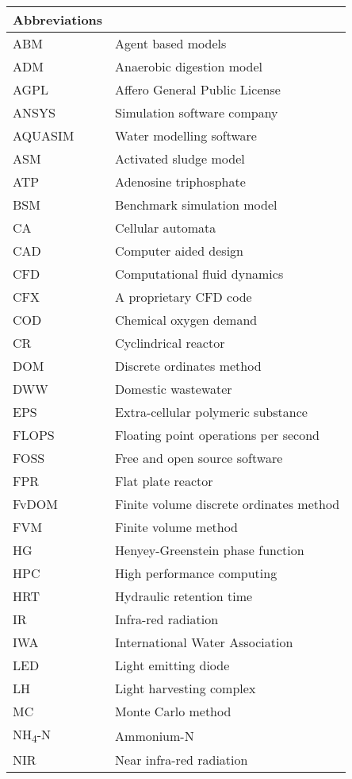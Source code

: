 \begin{center}
	\small
	\begin{longtable}{ll}
	\toprule
	Abbreviations & {} \\
	\bottomrule
ABM	&	Agent based models	\\
ADM	&	Anaerobic digestion model	\\
AGPL	&	Affero General Public License	\\
ANSYS	&	Simulation software company	\\
AQUASIM	&	Water modelling software	\\
ASM	&	Activated sludge model	\\
ATP	&	Adenosine triphosphate	\\
BSM	&	Benchmark simulation model	\\
CA	&	Cellular automata	\\
CAD	&	Computer aided design	\\
CFD	&	Computational fluid dynamics	\\
CFX	 &	A proprietary CFD code	\\
COD	&	Chemical oxygen demand	\\
CR	&	Cyclindrical reactor	\\
DOM	&	Discrete ordinates method	\\
DWW	&	Domestic wastewater	\\
EPS	&	Extra-cellular polymeric substance	\\
FLOPS	&	Floating point operations per second	\\
FOSS	&	Free and open source software	\\
FPR	&	Flat plate reactor	\\
FvDOM	&	Finite volume discrete ordinates method	\\
FVM	&	Finite volume method	\\
HG	&	Henyey-Greenstein phase function	\\
HPC	&	High performance computing	\\
HRT	&	Hydraulic retention time	\\
IR	&	Infra-red radiation	\\
IWA	&	International Water Association	\\
LED	&	Light emitting diode	\\
LH	&	Light harvesting complex	\\
MC	&	Monte Carlo method	\\
NH\textsubscript{4}-N	&	Ammonium-N	\\
NIR	&	Near infra-red radiation	\\

\end{longtable}
\end{center}
